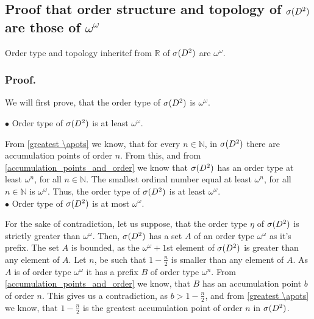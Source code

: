 \subsection{Proof that order structure and topology of ${{\sigma}(D^2)}$ are those of $\omega^\omega$}
\begin{theorem}\label{speD_order_type}
Order type and topology inheritef from $\mathbb{R}$ of ${{\sigma}(D^2)}$ are $\omega^\omega$. 
\end{theorem}
\subsubsection{Proof.} 

We will first prove, that the order type of ${{\sigma}(D^2)}$ is $\omega^\omega$.

$\bullet$ Order type of ${{\sigma}(D^2)}$ is at least $\omega^\omega$.

From \ref{greatest \apots} we know, that for every $n\in \mathbb{N}$, in ${{\sigma}(D^2)}$ there are 
accumulation points of order $n$. From this, and from \ref{accumulation_points_and_order} 
we know that ${{\sigma}(D^2)}$ has an order type at least $\omega^n$, for all $n\in \mathbb{N}$. 
The smallest ordinal number equal at least $\omega^n$, for all $n \in \mathbb{N}$ is 
$\omega^\omega$. Thus, the order type of ${{\sigma}(D^2)}$ is at least $\omega^\omega$.\\

$\bullet$ Order type of ${{\sigma}(D^2)}$ is at most $\omega^\omega$.

For the sake of contradiction, let us suppose, that the order type $\eta$ of ${{\sigma}(D^2)}$ is 
strictly greater than $\omega^\omega$. Then, ${{\sigma}(D^2)}$ has a set $A$ of an order type 
$\omega^\omega$ as it's prefix. The set $A$ is bounded, as the $\omega^\omega+1$st element of 
${{\sigma}(D^2)}$ is greater than any element of $A$. 
Let $n$, be such that $1-\frac{n}{2}$ is smaller than any element of $A$. 
As $A$ is of order type $\omega^\omega$ it has a prefix $B$ of order type $\omega^n$.
From \ref{accumulation_points_and_order} we know, that $B$ has an accumulation point $b$ 
of order $n$. This gives us a contradiction, as $b > 1-\frac{n}{2}$, and from \ref{greatest \apots} 
we know, that $1-\frac{n}{2}$ is the greatest accumulation point of order $n$ in ${{\sigma}(D^2)}$. \\

